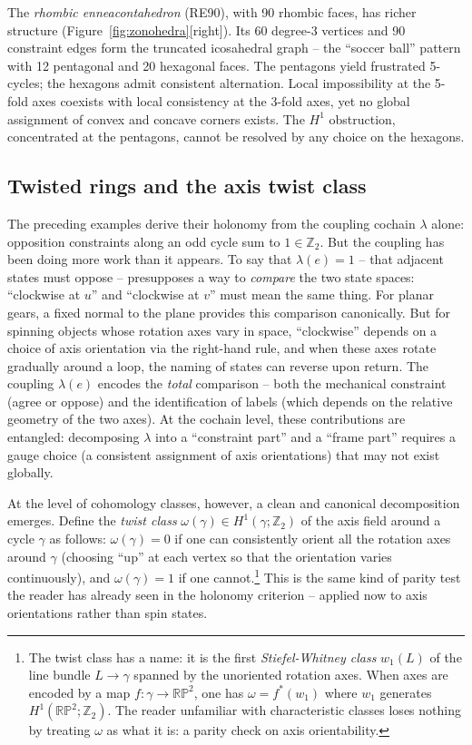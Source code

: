 \documentclass[11pt]{amsart}  %
\theoremstyle{plain}
\theoremstyle{definition}
\theoremstyle{remark}
\newcommand{\style}[1]{{\em #1}} %
\newcommand{\Z}{\mathbb{Z}} %
\newcommand{\coupling}{\lambda} %
\begin{document}
The \style{rhombic enneacontahedron} (RE90), with 90 rhombic faces, has richer structure (Figure~\ref{fig:zonohedra}[right]). Its 60 degree-3 vertices and 90 constraint edges form the truncated icosahedral graph -- the ``soccer ball'' pattern with 12 pentagonal and 20 hexagonal faces. The pentagons yield frustrated 5-cycles; the hexagons admit consistent alternation. Local impossibility at the 5-fold axes coexists with local consistency at the 3-fold axes, yet no global assignment of convex and concave corners exists. The $H^1$ obstruction, concentrated at the pentagons, cannot be resolved by any choice on the hexagons.

\subsection{Twisted rings and the axis twist class}
\label{sec:twisted}

The preceding examples derive their holonomy from the coupling 
cochain $\coupling$ alone: opposition constraints along an odd cycle 
sum to $1 \in \Z_2$. But the coupling has been doing more work than 
it appears. To say that $\coupling(e) = 1$ -- that adjacent states 
must oppose -- presupposes a way to \emph{compare} the two state 
spaces: ``clockwise at $u$'' and ``clockwise at $v$'' must mean the 
same thing. For planar gears, a fixed normal to the plane provides 
this comparison canonically. But for spinning objects whose rotation 
axes vary in space, ``clockwise'' depends on a choice of axis 
orientation via the right-hand rule, and when these axes rotate 
gradually around a loop, the naming of states can reverse upon 
return. The coupling $\coupling(e)$ encodes the \emph{total} 
comparison -- both the mechanical constraint (agree or oppose) and 
the identification of labels (which depends on the relative geometry 
of the two axes). At the cochain level, these contributions are 
entangled: decomposing $\coupling$ into a ``constraint part'' and a 
``frame part'' requires a gauge choice (a consistent assignment of 
axis orientations) that may not exist globally.

At the level of cohomology classes, however, a clean and canonical 
decomposition emerges. Define the \style{twist class} 
$\omega(\gamma) \in H^1(\gamma; \Z_2)$ of the axis field around a 
cycle $\gamma$ as follows: $\omega(\gamma) = 0$ if one can 
consistently orient all the rotation axes around $\gamma$ (choosing 
``up'' at each vertex so that the orientation varies continuously), 
and $\omega(\gamma) = 1$ if one 
cannot.\footnote{The twist class has a 
name: it is the first \emph{Stiefel-Whitney class} $w_1(L)$ of the line bundle 
$L \to \gamma$ spanned by the unoriented rotation axes. When axes 
are encoded by a map $f: \gamma \to \mathbb{RP}^2$, one has 
$\omega = f^*(w_1)$ where $w_1$ generates 
$H^1(\mathbb{RP}^2; \Z_2)$. The reader unfamiliar with 
characteristic classes loses nothing by treating $\omega$ as what it 
is: a parity check on axis orientability.}
%
This is the same kind of parity test the reader has already seen in 
the holonomy criterion -- applied now to axis orientations rather 
than spin states.
\end{document}
